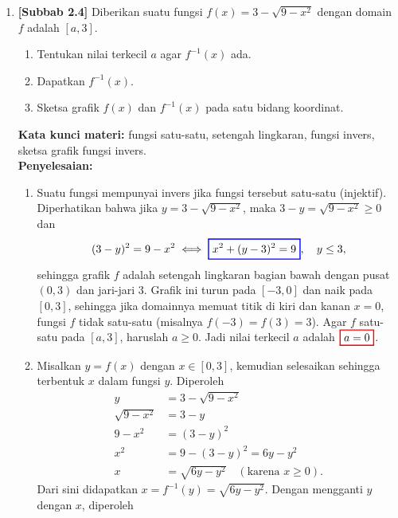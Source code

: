 \documentclass[10pt,openany,a4paper]{article}
\theoremstyle{definition}
\theoremstyle{definition}
\theoremstyle{plain}
\newenvironment{jawab}[2][tes]{%
\par\noindent\textbf{Kata kunci materi:} #1.\\
\textbf{Penyelesaian:} #2%
}{}
\begin{document}
\begin{enumerate}
    \item \textbf{[Subbab 2.4]} Diberikan suatu fungsi $f(x)=3-\sqrt{9-x^2}$ dengan domain $f$ adalah $[a,3]$.
    \begin{enumerate}
        \item Tentukan nilai terkecil $a$ agar $f^{-1}(x)$ ada.
        \item Dapatkan $f^{-1}(x)$.
        \item Sketsa grafik $f(x)$ dan $f^{-1}(x)$ pada satu bidang koordinat.
    \end{enumerate}
    \begin{jawab}[fungsi satu-satu, setengah lingkaran, fungsi invers, sketsa grafik fungsi invers]{
        \begin{enumerate}
            \item Suatu fungsi mempunyai invers jika fungsi tersebut satu-satu (injektif). Diperhatikan bahwa jika $y=3-\sqrt{9-x^2}$, maka $3-y=\sqrt{9-x^2}\geq 0$ dan
            \begin{align*}
                (3-y)^2 = 9-x^2 \iff \colorlet{oldcolor}{.}
        \color{blue}
        \setlength{\fboxrule}{1pt} \boxed{\color{oldcolor}x^2+(y-3)^2=9}\color{oldcolor},\quad y\leq 3,
            \end{align*}
            sehingga grafik $f$ adalah setengah lingkaran bagian bawah dengan pusat $(0,3)$ dan jari-jari $3$. Grafik ini turun pada $[-3,0]$ dan naik pada $[0,3]$, sehingga jika domainnya memuat titik di kiri dan kanan $x=0$, fungsi $f$ tidak satu-satu (misalnya $f(-3)=f(3)=3$). Agar $f$ satu-satu pada $[a,3]$, haruslah $a\geq 0$. Jadi nilai terkecil $a$ adalah $\colorlet{oldcolor}{.}
        \color{red}
        \setlength{\fboxrule}{1pt} \boxed{\color{oldcolor}a=0}\color{oldcolor}$.
            \item Misalkan $y=f(x)$ dengan $x\in[0,3]$, kemudian selesaikan sehingga terbentuk $x$ dalam fungsi $y$. Diperoleh
            \begin{align*}
                y &= 3-\sqrt{9-x^2}\\
                \sqrt{9-x^2} &= 3-y\\
                9-x^2 &= (3-y)^2\\
                x^2 &= 9-(3-y)^2 = 6y-y^2\\
                x &= \sqrt{6y-y^2} \quad (\text{karena } x\geq 0).
            \end{align*}
            Dari sini didapatkan $x = f^{-1}(y) = \sqrt{6y-y^2}$. Dengan mengganti $y$ dengan $x$, diperoleh
            \begin{align*}

\end{align*}
\end{enumerate}}
\end{jawab}
\end{enumerate}
\end{document}
